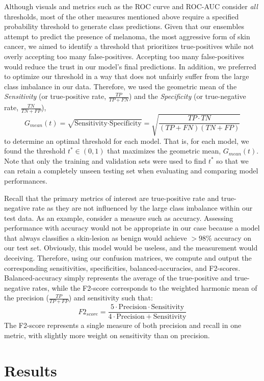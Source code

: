 \documentclass [MAS] {uclathes}
\begin{document}
Although visuals and metrics such as the ROC curve and ROC-AUC consider \textit{all} thresholds, most of the other measures mentioned above require a specified probability threshold to generate class predictions. Given that our ensembles attempt to predict the presence of melanoma, the most aggressive form of skin cancer, we aimed to identify a threshold that prioritizes true-positives while not overly accepting too many false-positives. Accepting too many false-positives would reduce the trust in our model's final predictions. In addition, we preferred to optimize our threshold in a way that does not unfairly suffer from the large class imbalance in our data. Therefore, we used the geometric mean of the \textit{Sensitivity} (or true-positive rate, $\frac{TP}{TP+FN}$) and the \textit{Specificity} (or true-negative rate, $\frac{TN}{TN+FP}$), $$G_{mean}(t) = \sqrt{\text{Sensitivity} \cdot \text{Specificity}} = \sqrt{\frac{TP \cdot TN }{(TP + FN)(TN + FP)}}$$ to determine an optimal threshold for each model. That is, for each model, we found the threshold $t^* \in (0, 1)$ that maximizes the geometric mean, $G_{mean}(t)$. Note that only the training and validation sets were used to find $t^*$ so that we can retain a completely unseen testing set when evaluating and comparing model performances.

Recall that the primary metrics of interest are true-positive rate and true-negative rate as they are not influenced by the large class imbalance within our test data. As an example, consider a measure such as accuracy. Assessing performance with accuracy would not be appropriate in our case because a model that always classifies a skin-lesion as benign would achieve $>98$\% accuracy on our test set. Obviously, this model would be useless, and the measurement would deceiving. Therefore, using our confusion matrices, we compute and output the corresponding sensitivities, specificities, balanced-accuracies, and F2-scores. Balanced-accuracy simply represents the average of the true-positive and true-negative rates, while the F2-score corresponds to the weighted harmonic mean of the precision ($\frac{TP}{TP + FP}$) and sensitivity such that: $$F2_{score} = \frac{5 \cdot \text{Precision} \cdot \text{Sensitivity}}{4 \cdot \text{Precision} +\text{Sensitivity}}$$ The F2-score represents a single measure of both precision and recall in one metric, with slightly more weight on sensitivity than on precision.

\chapter{Results}
\end{document}
